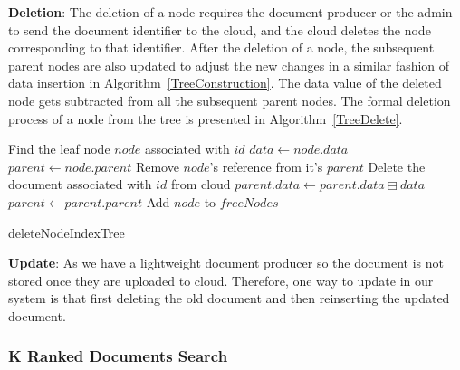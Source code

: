 \documentclass[sigconf,pdftex]{acmart}
\begin{document}
\textbf{Deletion}: The deletion of a node requires the document producer or the admin to send the document identifier to the cloud, and the cloud deletes the node corresponding to that identifier. After the deletion of a node, the subsequent parent nodes are also updated to adjust the new changes in a similar fashion of data insertion in Algorithm~\ref{TreeConstruction}. The data value of the deleted node gets subtracted from all the subsequent parent nodes. The formal deletion process of a node from the tree is presented in Algorithm~\ref{TreeDelete}.

\begin{algorithm}[!t]
\small{
\SetAlgoLined
{}
        Find the leaf node $node$ associated with $id$\;
        $data \xleftarrow{} node.data$\;
        $parent \xleftarrow{} node.parent$\;
        Remove $node$'s reference from it's $parent$\;
        Delete the document associated with $id$ from cloud\;
         {
            $parent.data \xleftarrow{} parent.data \boxminus data$\;
            $parent \xleftarrow{} parent.parent$\;
        }
        Add $node$ to $freeNodes$\;

\caption{deleteNodeIndexTree}
 \label{TreeDelete}
 }
\end{algorithm}


\textbf{Update}\label{update}: As we have a lightweight document producer so the document is not stored once they are uploaded to cloud. Therefore, one way to update in our system is that first deleting the old document and then reinserting the updated document.


\subsubsection{\textbf{K Ranked Documents Search}}\label{kbb-searching}







\end{document}
